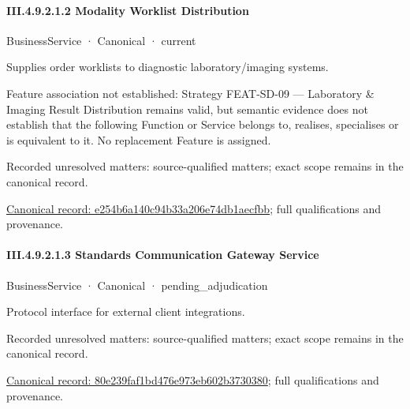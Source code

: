 \paragraph*{III.4.9.2.1.2 Modality Worklist Distribution}
\label{navigation:III.4.9.2.1.2}

\label{element:e254b6a140c94b33a206e74db1aecfbb}
{\small BusinessService · Canonical · current}\par

Supplies order worklists to diagnostic laboratory/imaging systems.



Feature association not established: Strategy FEAT-SD-09 — Laboratory \& Imaging Result Distribution remains valid, but semantic evidence does not establish that the following Function or Service belongs to, realises, specialises or is equivalent to it. No replacement Feature is assigned.


{\small Recorded unresolved matters: source-qualified matters; exact scope remains in the canonical record.}\par
{\footnotesize \href{../../../../../../../continuum/business/business-service/e254b6a140c94b33a206e74db1aecfbb.md}{Canonical record: e254b6a140c94b33a206e74db1aecfbb}; full qualifications and provenance.}\par
\paragraph*{III.4.9.2.1.3 Standards Communication Gateway Service}
\label{navigation:III.4.9.2.1.3}

\label{element:80e239faf1bd476e973eb602b3730380}
{\small BusinessService · Canonical · pending\_adjudication}\par

Protocol interface for external client integrations.


{\small Recorded unresolved matters: source-qualified matters; exact scope remains in the canonical record.}\par
{\footnotesize \href{../../../../../../../continuum/business/business-service/80e239faf1bd476e973eb602b3730380.md}{Canonical record: 80e239faf1bd476e973eb602b3730380}; full qualifications and provenance.}\par
